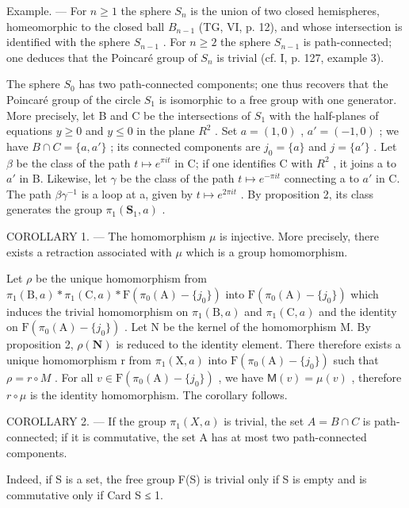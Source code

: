 Example. --- For \(n \geqslant 1\) the sphere \(S_{n}\) is the union of two closed hemispheres, homeomorphic to the closed ball \(B_{n-1}\) (TG, VI, p. 12), and whose intersection is identified with the sphere \(S_{n-1}\) . For \(n \geqslant 2\) the sphere \(S_{n-1}\) is path-connected; one deduces that the Poincaré group of \(S_{n}\) is trivial (cf. I, p. 127, example 3).

The sphere \(S_{0}\) has two path-connected components; one thus recovers that the Poincaré group of the circle \(S_{1}\) is isomorphic to a free group with one generator. More precisely, let B and C be the intersections of \(S_{1}\) with the half-planes of equations \(y \geqslant 0\) and \(y \leqslant 0\) in the plane \(R^{2}\) . Set \(a = (1,0)\) , \(a' = (-1,0)\) ; we have \(B \cap C = \{a, a'\}\) ; its connected components are \(j_{0} = \{a\}\) and \(j = \{a'\}\) . Let \(\beta\) be the class of the path \(t \mapsto e^{\pi it}\) in C; if one identifies C with \(R^{2}\) , it joins a to \(a'\) in B. Likewise, let \(\gamma\) be the class of the path \(t \mapsto e^{-\pi it}\) connecting a to \(a'\) in C. The path \(\beta\gamma^{-1}\) is a loop at a, given by \(t \mapsto e^{2\pi it}\) . By proposition 2, its class generates the group \(\pi_{1}(\mathbf{S}_{1}, a)\) .

COROLLARY 1. --- The homomorphism \(\mu\) is injective. More precisely, there exists a retraction associated with \(\mu\) which is a group homomorphism.

Let \(\rho\) be the unique homomorphism from \(\pi_1(\mathrm{B},a)*\pi_1(\mathrm{C},a)*\mathrm{F}(\pi_0(\mathrm{A})-\{j_0\})\) into \(\mathrm{F}(\pi_0(\mathrm{A}) - \{j_0\})\) which induces the trivial homomorphism on \(\pi_1(\mathrm{B},a)\) and \(\pi_1(\mathrm{C},a)\) and the identity on \(\mathrm{F}(\pi_0(\mathrm{A}) - \{j_0\})\) . Let N be the kernel of the homomorphism M. By proposition 2, \(\rho (\mathbf{N})\) is reduced to the identity element. There therefore exists a unique homomorphism r from \(\pi_1(\mathrm{X},a)\) into \(\mathrm{F}(\pi_0(\mathrm{A}) - \{j_0\})\) such that \(\rho = r\circ M\) . For all \(v\in \mathrm{F}(\pi_0(\mathrm{A}) - \{j_0\})\) , we have \(\mathsf{M}(v) = \mu (v)\) , therefore \(r\circ \mu\) is the identity homomorphism. The corollary follows.

COROLLARY 2. --- If the group \(\pi_{1}(X,a)\) is trivial, the set \(A = B \cap C\) is path-connected; if it is commutative, the set A has at most two path-connected components.

Indeed, if S is a set, the free group F(S) is trivial only if S is empty and is commutative only if Card S ≤ 1.

